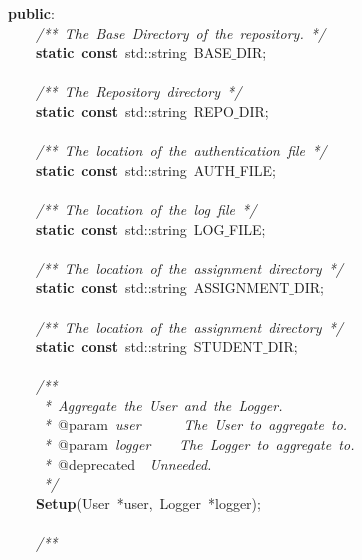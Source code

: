 \mbox{}\textbf{public}: \\
\mbox{}\ \ \ \ \textit{/**\ The\ Base\ Directory\ of\ the\ repository.\ */} \\
\mbox{}\ \ \ \ \textbf{static}\ \textbf{const}\ std::string\ BASE$\_$DIR; \\
\mbox{} \\
\mbox{}\ \ \ \ \textit{/**\ The\ Repository\ directory\ */} \\
\mbox{}\ \ \ \ \textbf{static}\ \textbf{const}\ std::string\ REPO$\_$DIR; \\
\mbox{} \\
\mbox{}\ \ \ \ \textit{/**\ The\ location\ of\ the\ authentication\ file\ */} \\
\mbox{}\ \ \ \ \textbf{static}\ \textbf{const}\ std::string\ AUTH$\_$FILE; \\
\mbox{} \\
\mbox{}\ \ \ \ \textit{/**\ The\ location\ of\ the\ log\ file\ */} \\
\mbox{}\ \ \ \ \textbf{static}\ \textbf{const}\ std::string\ LOG$\_$FILE; \\
\mbox{} \\
\mbox{}\ \ \ \ \textit{/**\ The\ location\ of\ the\ assignment\ directory\ */} \\
\mbox{}\ \ \ \ \textbf{static}\ \textbf{const}\ std::string\ ASSIGNMENT$\_$DIR; \\
\mbox{} \\
\mbox{}\ \ \ \ \textit{/**\ The\ location\ of\ the\ assignment\ directory\ */} \\
\mbox{}\ \ \ \ \textbf{static}\ \textbf{const}\ std::string\ STUDENT$\_$DIR; \\
\mbox{} \\
\mbox{}\ \ \ \ \textit{/**} \\
\mbox{}\textit{\ \ \ \ \ *\ Aggregate\ the\ User\ and\ the\ Logger.} \\
\mbox{}\textit{\ \ \ \ \ *\ }@param\textit{\ user\ \ \ \ \ \ The\ User\ to\ aggregate\ to.} \\
\mbox{}\textit{\ \ \ \ \ *\ }@param\textit{\ logger\ \ \ \ The\ Logger\ to\ aggregate\ to.} \\
\mbox{}\textit{\ \ \ \ \ *\ }@deprecated\textit{\ \ Unneeded.} \\
\mbox{}\textit{\ \ \ \ \ */} \\
\mbox{}\ \ \ \ \textbf{Setup}(User\ *user,\ Logger\ *logger); \\
\mbox{} \\
\mbox{}\ \ \ \ \textit{/**} \\
